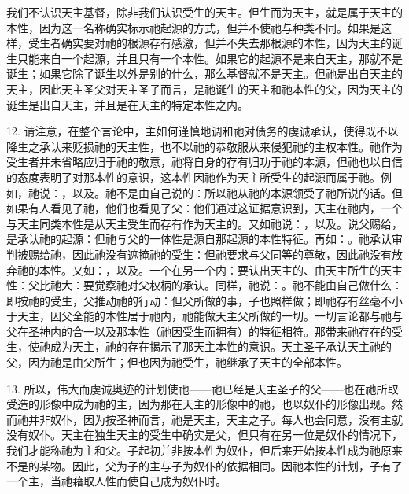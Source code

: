 我们不认识天主基督，除非我们认识受生的天主。但生而为天主，就是属于天主的本性，因为这一名称确实标示祂起源的方式，但并不使祂与种类不同。如果是这样，受生者确实要对祂的根源存有感激，但并不失去那根源的本性，因为天主的诞生只能来自一个起源，并且只有一个本性。如果它的起源不是来自天主，那就不是诞生；如果它除了诞生以外是别的什么，那么基督就不是天主。但祂是出自天主的天主，因此天主圣父对天主圣子而言，是祂诞生的天主和祂本性的父，因为天主的诞生是出自天主，并且是在天主的特定本性之内。\par

12. 请注意，在整个言论中，主如何谨慎地调和祂对债务的虔诚承认，使得既不以降生之承认来贬损祂的天主性，也不以祂的恭敬服从来侵犯祂的主权本性。祂作为受生者并未省略应归于祂的敬意，祂将自身的存有归功于祂的本源，但祂也以自信的态度表明了对那本性的意识，这本性因祂作为天主所受生的起源而属于祂。例如，祂说：，以及。祂不是由自己说的：所以祂从祂的本源领受了祂所说的话。但如果有人看见了祂，他们也看见了父：他们通过这证据意识到，天主在祂内，一个与天主同类本性是从天主受生而存有作为天主的。又如祂说：，以及。说父赐给，是承认祂的起源：但祂与父的一体性是源自那起源的本性特征。再如：。祂承认审判被赐给祂，因此祂没有遮掩祂的受生：但祂要求与父同等的尊敬，因此祂没有放弃祂的本性。又如：，以及。一个在另一个内：要认出天主的、由天主所生的天主性：父比祂大：要觉察祂对父权柄的承认。同样，祂说：。祂不能由自己做什么：即按祂的受生，父推动祂的行动：但父所做的事，子也照样做；即祂存有丝毫不小于天主，因父全能的本性居于祂内，祂能做天主父所做的一切。一切言论都与祂与父在圣神内的合一以及那本性（祂因受生而拥有）的特征相符。那带来祂存在的受生，使祂成为天主，祂的存在揭示了那天主本性的意识。天主圣子承认天主祂的父，因为祂是由父所生；但也因为祂受生，祂继承了天主的全部本性。\par

13. 所以，伟大而虔诚奥迹的计划使祂——祂已经是天主圣子的父——也在祂所取受造的形像中成为祂的主，因为那在天主的形像中的祂，也以奴仆的形像出现。然而祂并非奴仆，因为按圣神而言，祂是天主，天主之子。每人也会同意，没有主就没有奴仆。天主在独生天主的受生中确实是父，但只有在另一位是奴仆的情况下，我们才能称祂为主和父。子起初并非按本性为奴仆，但后来开始按本性成为祂原来不是的某物。因此，父为子的主与子为奴仆的依据相同。因祂本性的计划，子有了一个主，当祂藉取人性而使自己成为奴仆时。\par

